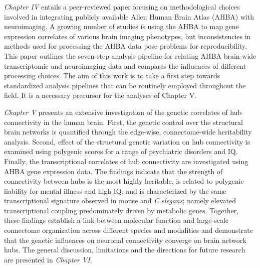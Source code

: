 \textit{Chapter IV} entails a peer-reviewed paper focusing on methodological choices involved in integrating publicly available Allen Human Brain Atlas (AHBA) with neuroimaging. A growing number of studies is using the AHBA to map gene expression correlates of various brain imaging phenotypes, but inconsistencies in methods used for processing the AHBA data pose problems for reproducibility. This paper outlines the seven-step analysis pipeline for relating AHBA brain-wide transcriptomic and neuroimaging data and compares the influences of different processing choices. The aim of this work is to take a first step towards standardized analysis pipelines that can be routinely employed throughout the field. It is a necessary precursor for the analyses of Chapter V.

\textit{Chapter V} presents an extensive investigation of the genetic correlates of hub connectivity in the human brain. First, the genetic control over the structural brain networks is quantified through the edge-wise, connectome-wide heritability analysis. Second, effect of the structural genetic variation on hub connectivity is examined using polygenic scores for a range of psychiatric disorders and IQ. Finally, the transcriptional correlates of hub connectivity are investigated using AHBA gene expression data. The findings indicate that the strength of connectivity between hubs is the most highly heritable, is related to polygenic liability for mental illness and high IQ, and is characterized by the same transcriptional signature observed in mouse and \textit{C.elegans}; namely elevated transcriptional coupling predominately driven by metabolic genes. Together, these findings establish a link between molecular function and large-scale connectome organization across different species and modalities and demonstrate that the genetic influences on neuronal connectivity converge on brain network hubs. The general discussion, limitations and the directions for future research are presented in \textit{Chapter VI}. 



